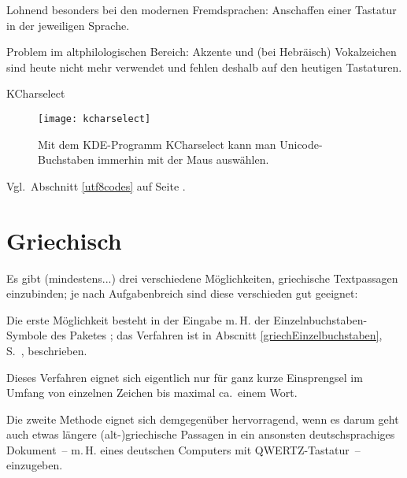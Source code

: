 


Lohnend besonders bei den modernen Fremdsprachen: Anschaffen einer Tastatur in der jeweiligen
Sprache.

Problem im altphilologischen Bereich: Akzente und (bei Hebräisch) Vokalzeichen sind heute
nicht mehr verwendet und fehlen deshalb auf den heutigen Tastaturen.

KCharselect

\begin{figure}
 \texttt{[image: kcharselect]}
 \caption{Mit dem KDE-Programm KCharselect kann man Unicode-Buchstaben immerhin mit der Maus
 auswählen.}
\end{figure}


Vgl.\ Abschnitt \ref{utf8codes} auf Seite \pageref{utf8codes}.

\section{Griechisch}

Es gibt (mindestens...) drei verschiedene Möglichkeiten, griechische Textpassagen einzubinden;
je nach Aufgabenbreich sind diese verschieden gut geeignet:



Die erste Möglichkeit besteht in der Eingabe m.\,H. der Einzelnbuchstaben-Symbole des Paketes
; das Verfahren ist in Abscnitt \ref{griechEinzelbuchstaben}, 
S.~\pageref{griechEinzelbuchstaben}, beschrieben.

Dieses Verfahren eignet sich eigentlich nur für ganz kurze Einsprengsel im Umfang von 
einzelnen Zeichen bis maximal ca.\ einem Wort.



Die zweite Methode eignet sich demgegenüber hervorragend, wenn es darum geht auch etwas 
längere (alt-)griechische Passagen in ein ansonsten deutschsprachiges Dokument~-- m.\,H. eines
deutschen Computers mit QWERTZ-Tastatur~-- einzugeben.

